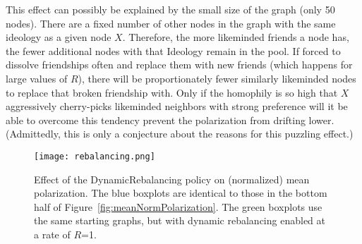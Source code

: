 This effect can possibly be explained by the small size of the graph (only 50
nodes). There are a fixed number of other nodes in the graph with the same
ideology as a given node $X$. Therefore, the more likeminded friends a node
has, the fewer additional nodes with that Ideology remain in the pool. If
forced to dissolve friendships often and replace them with new friends (which
happens for large values of $R$), there will be proportionately fewer
similarly likeminded nodes to replace that broken friendship with. Only if the
homophily is so high that $X$ aggressively cherry-picks likeminded neighbors
with strong preference will it be able to overcome this tendency prevent the
polarization from drifting lower. (Admittedly, this is only a conjecture about
the reasons for this puzzling effect.)

\begin{figure*}
\centering
\texttt{[image: rebalancing.png]}
\caption{Effect of the DynamicRebalancing policy on (normalized) mean
polarization. The blue boxplots are identical to those in the bottom half of
Figure~\ref{fig:meanNormPolarization}. The green boxplots use the same 
starting graphs, but with dynamic rebalancing enabled at a rate of $R$=1.}
\label{fig:rebalancing}
\end{figure*}
